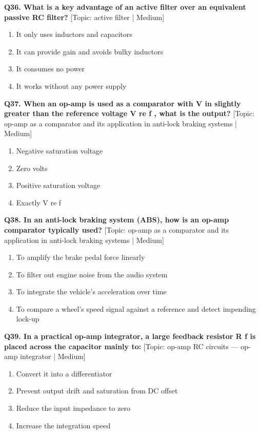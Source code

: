 \noindent\textbf{Q36. What is a key advantage of an active filter over an equivalent passive RC filter?} \hfill [Topic: active filter | Medium]
\begin{enumerate}[label=(\alph*),topsep=2pt,itemsep=1pt,partopsep=0pt,parsep=0pt]
    \item {It only uses inductors and capacitors}
    \item {It can provide gain and avoids bulky inductors}
    \item {It consumes no power}
    \item {It works without any power supply}
\end{enumerate}
\vspace{2mm}

\noindent\textbf{Q37. When an op-amp is used as a comparator with V in slightly greater than the reference voltage V re f , what is the output?} \hfill [Topic: op-amp as a comparator and its application in anti-lock braking systems | Medium]
\begin{enumerate}[label=(\alph*),topsep=2pt,itemsep=1pt,partopsep=0pt,parsep=0pt]
    \item {Negative saturation voltage}
    \item {Zero volts}
    \item {Positive saturation voltage}
    \item {Exactly V re f}
\end{enumerate}
\vspace{2mm}

\noindent\textbf{Q38. In an anti-lock braking system (ABS), how is an op-amp comparator typically used?} \hfill [Topic: op-amp as a comparator and its application in anti-lock braking systems | Medium]
\begin{enumerate}[label=(\alph*),topsep=2pt,itemsep=1pt,partopsep=0pt,parsep=0pt]
    \item {To amplify the brake pedal force linearly}
    \item {To filter out engine noise from the audio system}
    \item {To integrate the vehicle's acceleration over time}
    \item {To compare a wheel's speed signal against a reference and detect impending lock-up}
\end{enumerate}
\vspace{2mm}

\noindent\textbf{Q39. In a practical op-amp integrator, a large feedback resistor R f is placed across the capacitor mainly to:} \hfill [Topic: op-amp RC circuits --- op-amp integrator | Medium]
\begin{enumerate}[label=(\alph*),topsep=2pt,itemsep=1pt,partopsep=0pt,parsep=0pt]
    \item {Convert it into a differentiator}
    \item {Prevent output drift and saturation from DC offset}
    \item {Reduce the input impedance to zero}
    \item {Increase the integration speed}
\end{enumerate}
\vspace{2mm}

